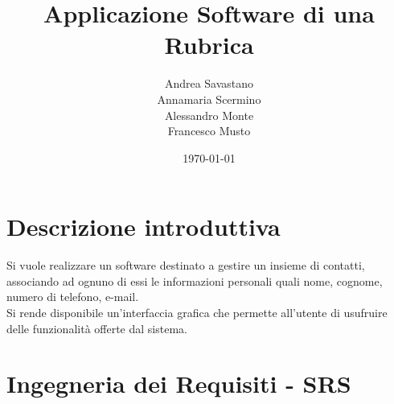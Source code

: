\documentclass[12pt, a4paper]{article}
\title{Applicazione Software di una Rubrica}
\author{Andrea Savastano 
	\\ Annamaria Scermino
	\\ Alessandro Monte 
	\\ Francesco Musto}
\date{\today}
\begin{document}
	\fancyhf{}
	\thispagestyle{fancy}
	
	\maketitle
	\newpage
	\tableofcontents 
	\listoffigures
	
	\newpage
	\section*{Descrizione introduttiva}
	Si vuole realizzare un software destinato a gestire un insieme di contatti, associando ad ognuno di essi le informazioni personali quali nome, cognome, numero di telefono, e-mail.
	\vspace{.2cm}\\Si rende disponibile un'interfaccia grafica che permette all'utente di usufruire delle funzionalità offerte dal sistema.
	
	\newpage
	\fancyhf{} %
	\fancyhead[L]{\nouppercase{\leftmark}} %
	\section{Ingegneria dei Requisiti - SRS}
	
	
	
\end{document}
